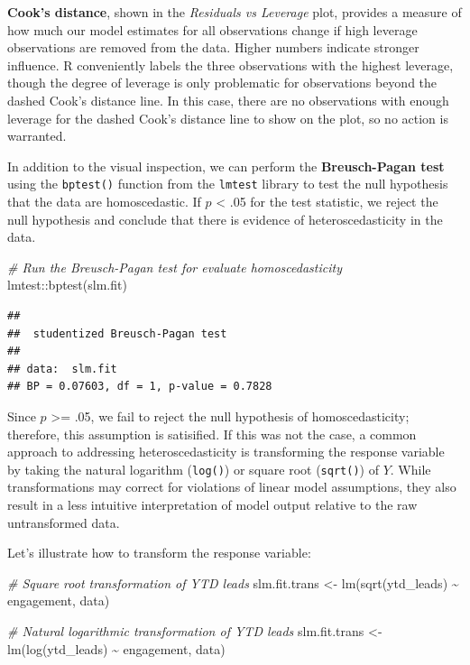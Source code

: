 \documentclass[
]{book}
\newenvironment{Shaded}{\begin{snugshade}}{\end{snugshade}}
\newcommand{\CommentTok}[1]{\textcolor[rgb]{0.56,0.35,0.01}{\textit{#1}}}
\newcommand{\FunctionTok}[1]{\textcolor[rgb]{0.00,0.00,0.00}{#1}}
\newcommand{\NormalTok}[1]{#1}
\newcommand{\OtherTok}[1]{\textcolor[rgb]{0.56,0.35,0.01}{#1}}
\newcommand{\SpecialCharTok}[1]{\textcolor[rgb]{0.00,0.00,0.00}{#1}}
\begin{document}
\textbf{Cook's distance}, shown in the \emph{Residuals vs Leverage} plot, provides a measure of how much our model estimates for all observations change if high leverage observations are removed from the data. Higher numbers indicate stronger influence. R conveniently labels the three observations with the highest leverage, though the degree of leverage is only problematic for observations beyond the dashed Cook's distance line. In this case, there are no observations with enough leverage for the dashed Cook's distance line to show on the plot, so no action is warranted.

In addition to the visual inspection, we can perform the \textbf{Breusch-Pagan test} using the \texttt{bptest()} function from the \texttt{lmtest} library to test the null hypothesis that the data are homoscedastic. If \(p\) \textless{} .05 for the test statistic, we reject the null hypothesis and conclude that there is evidence of heteroscedasticity in the data.

\begin{Shaded}
\begin{Highlighting}[]
\CommentTok{\# Run the Breusch{-}Pagan test for evaluate homoscedasticity}
\NormalTok{lmtest}\SpecialCharTok{::}\FunctionTok{bptest}\NormalTok{(slm.fit)}
\end{Highlighting}
\end{Shaded}

\begin{verbatim}
## 
##  studentized Breusch-Pagan test
## 
## data:  slm.fit
## BP = 0.07603, df = 1, p-value = 0.7828
\end{verbatim}

Since \(p\) \textgreater= .05, we fail to reject the null hypothesis of homoscedasticity; therefore, this assumption is satisified. If this was not the case, a common approach to addressing heteroscedasticity is transforming the response variable by taking the natural logarithm (\texttt{log()}) or square root (\texttt{sqrt()}) of \(Y\). While transformations may correct for violations of linear model assumptions, they also result in a less intuitive interpretation of model output relative to the raw untransformed data.

Let's illustrate how to transform the response variable:

\begin{Shaded}
\begin{Highlighting}[]
\CommentTok{\# Square root transformation of YTD leads}
\NormalTok{slm.fit.trans }\OtherTok{\textless{}{-}} \FunctionTok{lm}\NormalTok{(}\FunctionTok{sqrt}\NormalTok{(ytd\_leads) }\SpecialCharTok{\textasciitilde{}}\NormalTok{ engagement, data)}

\CommentTok{\# Natural logarithmic transformation of YTD leads}
\NormalTok{slm.fit.trans }\OtherTok{\textless{}{-}} \FunctionTok{lm}\NormalTok{(}\FunctionTok{log}\NormalTok{(ytd\_leads) }\SpecialCharTok{\textasciitilde{}}\NormalTok{ engagement, data)}
\end{Highlighting}
\end{Shaded}
\end{document}

